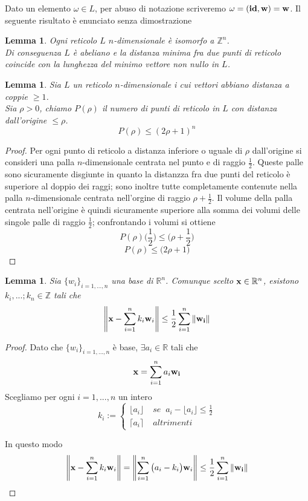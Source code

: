 \documentclass[a4paper,11pt,openright,twoside	]{book}
\newtheorem{lemma}[theorem]{Lemma}
\begin{document}
Dato un elemento $\omega \in L$, per abuso di notazione scriveremo $\omega = (\vb{id, w} ) = \vb{w}$. 
Il seguente risultato è enunciato senza dimostrazione 
\begin{lemma}
Ogni reticolo $L$ $n$-dimensionale è isomorfo a $\mathbb{Z}^n$. \\
Di conseguenza $L$ è abeliano e la distanza minima fra due punti di reticolo coincide con la lunghezza del minimo vettore non nullo in $L$.  
\end{lemma}

\begin{lemma}
\label{lemma:rho}
Sia $L$ un reticolo $n$-dimensionale i cui vettori abbiano distanza a coppie $\geq 1$. \\
Sia $\rho >0$, chiamo $P(\rho)$ il numero di punti di reticolo in $L$ con distanza dall'origine $\leq \rho$. 
\[ P(\rho) \leq (2 \rho +1)^n\]
\end{lemma}
\begin{proof}
Per ogni punto di reticolo a distanza inferiore o uguale di $\rho$ dall'origine si consideri una palla $n$-dimensionale centrata nel punto e di raggio $\frac{1}{2}$. Queste palle sono sicuramente disgiunte in quanto la distanzza fra due punti del reticolo è superiore al doppio dei raggi; sono inoltre tutte completamente contenute nella palla $n$-dimensionale centrata nell'orgine di raggio $ \rho + \frac{1}{2}$. 
Il volume della palla centrata nell'origine è quindi sicuramente superiore alla somma dei volumi delle singole palle di raggio $\frac{1}{2}$; confrontando i volumi si ottiene
\[ P(\rho) \bigg(  \frac{1}{2} \bigg) \leq \bigg( \rho + \frac{1}{2} \bigg) \]
\[ P(\rho) \leq \bigg( 2 \rho + 1 \bigg)\]
\end{proof}

\begin{lemma}
\label{lemma:somma}
Sia $\{w_i \}_{i=1,...,n}$ una base di $\mathbb{R}^n$. Comunque scelto $\vb{x} \in \mathbb{R}^n$, esistono $k_i, ...; k_n \in \mathbb{Z}$ tali che 
\[ \norm{\vb{x} - \sum_{i=1}^{n} k_i \vb{w}_i} \leq \frac{1}{2} \sum_{i=1}^{n} \norm{\vb{w_i}} \] 
\end{lemma}

\begin{proof}
Dato che $\{w_i \}_{i=1,...,n}$ è base, $\exists a_i \in \mathbb{R}$ tali che 
\[\vb{x} = \sum_{i=1}^{n} a_i \vb{w_i} \]
Scegliamo per ogni $i= 1,...,n$ un intero 
\[ k_i := \begin{cases} 
\lfloor a_i \rfloor \;  & se \; \; a_i - \lfloor a_i \rfloor \leq \frac{1}{2} \\
\lceil a_i \rceil \; & altrimenti
\end{cases}\]

In questo modo 
\[ \norm{\vb{x} - \sum_{i=1}^{n} k_i \vb{w}_i} = \norm{\sum_{i=1}^{n} \big(a_i - k_i \big)\vb{w}_i} \leq  \frac{1}{2} \sum_{i=1}^{n} \norm{\vb{w_i}}  \]
\end{proof}
\end{document}
